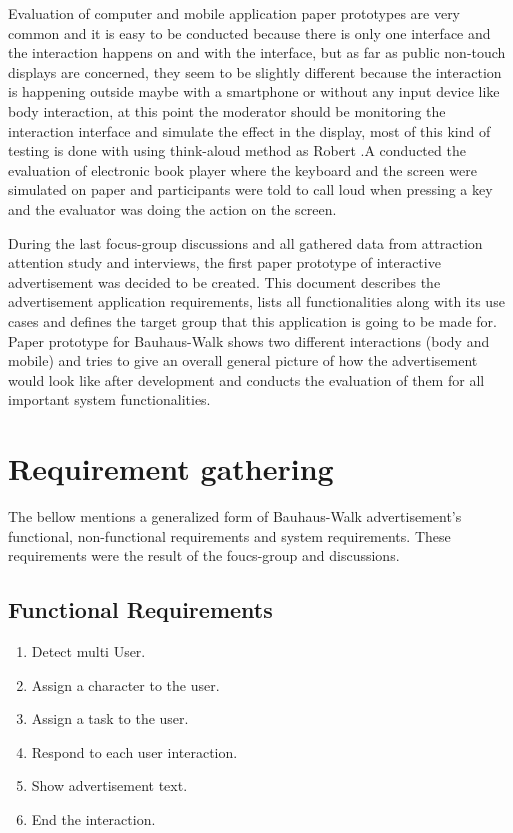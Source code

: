 Evaluation of computer and mobile application paper prototypes are very common and it is easy to be conducted because there is only one interface and the interaction happens on and with the interface, but as far as public non-touch displays are concerned, they seem to be slightly different because the interaction is happening outside maybe with a smartphone or without any input device like body interaction, at this point the moderator should be monitoring the interaction interface and simulate the effect in the display, most of this kind of testing is done with using think-aloud method as Robert .A \cite{usabilityproblems} conducted the evaluation of electronic book player where the keyboard and the screen were simulated on paper and participants were told to call loud when pressing a key and the evaluator was doing the action on the screen.


During the last focus-group discussions and all gathered data from attraction attention study and interviews, the first paper prototype of interactive advertisement was decided to be created. This document describes the advertisement application requirements, lists all functionalities along with its use cases and defines the target group that this application is going to be made for. Paper prototype for Bauhaus-Walk \cite{BauhausWalk} shows two different interactions (body and mobile) and tries to give an overall general picture of how the advertisement would look like after development and conducts the evaluation of them for all important system functionalities.

\section{Requirement gathering}
The bellow mentions a generalized form of Bauhaus-Walk advertisement's functional, non-functional requirements and system requirements. These requirements were the result of the foucs-group and discussions.

\subsection{Functional Requirements}

\begin{enumerate}
\item	Detect multi User.
\item	Assign a character to the user. 
\item	Assign a task to the user.
\item	Respond to each user interaction.
\item	Show advertisement text.
\item	End the interaction.
\end{enumerate}


